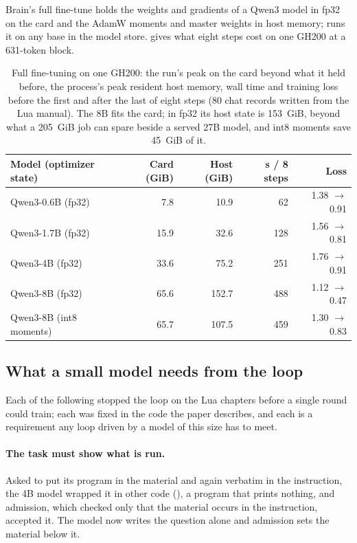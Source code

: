 Brain's full fine-tune holds the weights and gradients of a Qwen3 model in fp32 on the
card and the AdamW moments and master weights in host memory; 
runs it on any base in the model store.  gives what eight steps
cost on one GH200 at a 631-token block.

\begin{table}[tbp]
  \centering
  \small
  \begin{tabular}{lrrrr}
    \toprule
    Model (optimizer state) & Card (GiB) & Host (GiB) & s / 8 steps & Loss \\
    \midrule
    Qwen3-0.6B (fp32) & 7.8 & 10.9 & 62 & 1.38 $\to$ 0.91 \\
    Qwen3-1.7B (fp32) & 15.9 & 32.6 & 128 & 1.56 $\to$ 0.81 \\
    Qwen3-4B (fp32) & 33.6 & 75.2 & 251 & 1.76 $\to$ 0.91 \\
    Qwen3-8B (fp32) & 65.6 & 152.7 & 488 & 1.12 $\to$ 0.47 \\
    Qwen3-8B (int8 moments) & 65.7 & 107.5 & 459 & 1.30 $\to$ 0.83 \\
    \bottomrule
  \end{tabular}
  \caption{Full fine-tuning on one GH200: the run's peak on the card beyond what it held
  before, the process's peak resident host memory, wall time and training loss before the
  first and after the last of eight steps (80 chat records written from the Lua manual).
  The 8B fits the card; in fp32 its host state is 153~GiB, beyond what a 205~GiB job can
  spare beside a served 27B model, and int8 moments save 45~GiB of it.}
  \label{tab:fullft}
\end{table}


\subsection{What a small model needs from the loop}\label{sec:small-model-needs}

Each of the following stopped the loop on the Lua chapters before a single round could
train; each was fixed in the code the paper describes, and each is a requirement any loop
driven by a model of this size has to meet.

\paragraph{The task must show what is run.} Asked to put its program in the material and
again verbatim in the instruction, the 4B model wrapped it in other code
(), a program that prints nothing, and admission, which
checked only that the material occurs in the instruction, accepted it. The model now
writes the question alone and admission sets the material below it.

